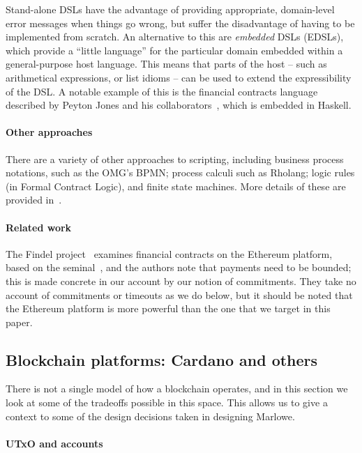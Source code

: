 \documentclass[
      acmsmall
    , screen
  ]{acmart}
\begin{document}
Stand-alone DSLs have the advantage of providing appropriate, domain-level error messages when things go wrong, but suffer the disadvantage of having to be implemented from scratch. An alternative to this are \emph{embedded} DSLs (EDSLs), which provide a ``little language'' for the particular domain embedded within a general-purpose host language. This means that parts of the host -- such as arithmetical expressions, or list idioms --  can be used to extend the expressibility of the DSL. A notable example of this is the financial contracts language described by Peyton Jones and his collaborators~\cite{PeytonJones:2000}, which is embedded in Haskell.

\paragraph{Other approaches}

There are a variety of other approaches to scripting, including business process notations, such as the OMG's BPMN; 
process calculi such as Rholang; logic rules (in Formal Contract Logic), and finite state machines. More details of 
these are provided in~\cite{cryptoeprint:2016:1156}.

\paragraph{Related work}

The Findel project~\cite{findel} examines financial contracts on the Ethereum platform, based on the seminal~\cite{PeytonJones:2000}, and the authors note that payments need to be bounded; this is made concrete in our account by our notion of commitments. They take no account of commitments or timeouts as we do below, but it should be noted that the Ethereum platform is more powerful than the one that we target in this paper.


\subsection{Blockchain platforms: Cardano and others}

There is not a single model of how a blockchain operates, and in this section we look at some of the tradeoffs possible in this space. This allows us to give a context to some of the design decisions taken in designing Marlowe.  

\paragraph{UTxO and accounts}
\end{document}
